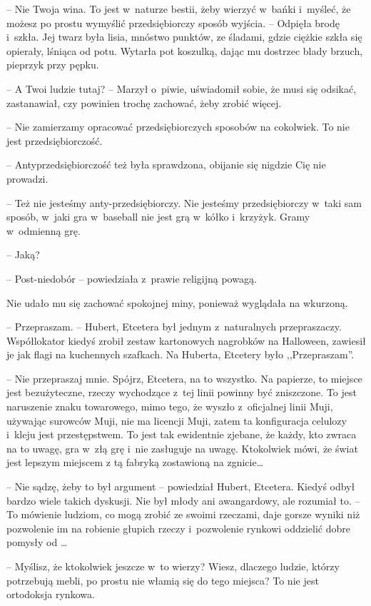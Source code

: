 \documentclass[oneside,polish,11pt,sfheadings]{mwbk}
\begin{document}
-- Nie Twoja wina. To jest w~naturze bestii, żeby wierzyć w~bańki i~myśleć, że możesz po prostu wymyślić przedsiębiorczy sposób wyjścia. -- Odpięła brodę i~szkła. Jej twarz była lisia, mnóstwo punktów, ze
śladami, gdzie ciężkie szkła się opierały, lśniąca od potu. Wytarła pot
koszulką, dając mu dostrzec blady brzuch, pieprzyk przy pępku.

-- A Twoi ludzie tutaj? -- Marzył o~piwie, uświadomił sobie, że musi się
odsikać, zastanawiał, czy powinien trochę zachować, żeby zrobić więcej.

-- Nie zamierzamy opracować przedsiębiorczych sposobów na cokolwiek. To
nie jest przedsiębiorczość.

-- Antyprzedsiębiorczość też była sprawdzona, obijanie się nigdzie Cię
nie prowadzi.

-- Też nie jesteśmy anty-przedsiębiorczy. Nie jesteśmy przedsiębiorczy w~taki sam sposób, w~jaki gra w~baseball nie jest grą w~kółko i~krzyżyk.
Gramy w~odmienną grę.

-- Jaką?

-- Post-niedobór -- powiedziała z~prawie religijną powagą.

Nie udało mu się zachować spokojnej miny, ponieważ wyglądała na
wkurzoną. 

-- Przepraszam. -- Hubert, Etcetera był jednym z~naturalnych
przepraszaczy. Współlokator kiedyś zrobił zestaw kartonowych nagrobków
na Halloween, zawiesił je jak flagi na kuchennych szafkach. Na Huberta,
Etcetery było ,,Przepraszam''.

-- Nie przepraszaj mnie. Spójrz, Etcetera, na to wszystko. Na papierze,
to miejsce jest bezużyteczne, rzeczy wychodzące z~tej linii powinny być
zniszczone. To jest naruszenie znaku towarowego, mimo tego, że wyszło z~oficjalnej linii Muji, używając surowców Muji, nie ma licencji Muji,
zatem ta konfiguracja celulozy i~kleju jest przestępstwem. To jest tak
ewidentnie zjebane, że każdy, kto zwraca na to uwagę, gra w~złą grę i~nie zasługuje na uwagę. Ktokolwiek mówi, że świat jest lepszym miejscem
z tą fabryką zostawioną na zgnicie\ldots 

-- Nie sądzę, żeby to był argument -- powiedział Hubert, Etcetera. Kiedyś
odbył bardzo wiele takich dyskusji. Nie był młody ani awangardowy, ale
rozumiał to. -- To mówienie ludziom, co mogą zrobić ze swoimi rzeczami,
daje gorsze wyniki niż pozwolenie im na robienie głupich rzeczy i~pozwolenie rynkowi oddzielić dobre pomysły od \ldots 

-- Myślisz, że ktokolwiek jeszcze w~to wierzy? Wiesz, dlaczego ludzie,
którzy potrzebują mebli, po prostu nie włamią się do tego miejsca? To
nie jest ortodoksja rynkowa.
\end{document}
